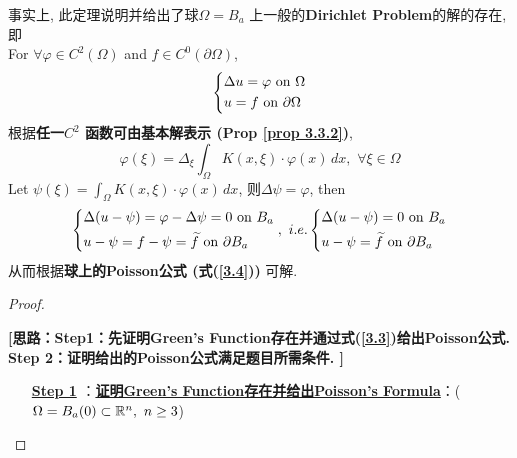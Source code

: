 \begin{thm}
		\begin{rmk}
			事实上, 此定理说明并给出了球$\Omega = B_a$ 上一般的\textbf{Dirichlet Problem}的解的存在, 即 \\
			For $\forall \varphi \in C^2(\Omega)$ and $f \in C^0(\partial \Omega)$, 
			\begin{align*}
				\begin{dcases*}
					\Delta u = \varphi \,\, \text{on} \,\, \Omega \\
					u = f \,\, \text{on} \,\, \partial \Omega
				\end{dcases*}
			\end{align*}
			根据\textbf{任一$C^2$ 函数可由基本解表示 (Prop \ref{prop 3.3.2})}, 
			\[ \varphi(\xi) = \Delta_\xi \int_{\Omega} K(x , \xi) \cdot \varphi(x) \, dx , \,\, \forall \xi \in \Omega \]
			Let $\psi(\xi) = \int_{\Omega} K(x , \xi) \cdot \varphi(x) \, dx$, 则$\Delta \psi = \varphi$, then
			\begin{align*}
				\begin{dcases*}
					\Delta (u - \psi) = \varphi - \Delta \psi = 0 \,\, \text{on} \,\, B_a \\
					u - \psi = f - \psi = \widetilde{f} \,\, \text{on} \,\, \partial B_a
				\end{dcases*} , \,\, i.e.
				\begin{dcases*}
					\Delta (u - \psi) = 0 \,\, \text{on} \,\, B_a \\
					u - \psi = \widetilde{f} \,\, \text{on} \,\, \partial B_a
				\end{dcases*}
			\end{align*}
			从而根据\textbf{球上的Poisson公式 (式(\ref{3.4}))} 可解. 
		\end{rmk}
		
		\newpage
		
		\begin{proof}
			\begin{center}
				\textbf{[思路：Step1：先证明Green's Function存在并通过式(\ref{3.3})给出Poisson公式. \\
					Step 2：证明给出的Poisson公式满足题目所需条件. ]}
			\end{center}
			
			\vspace*{1em}
			
			\begin{enumerate}
				\item[\underline{\textbf{Step 1}}]：\underline{\textbf{证明Green's Function存在并给出Poisson's Formula}}：($\Omega = B_a(0) \subset \mathbb{R}^n , \,\, n \geq 3$) 
				

\end{enumerate}
\end{proof}
\end{thm}
